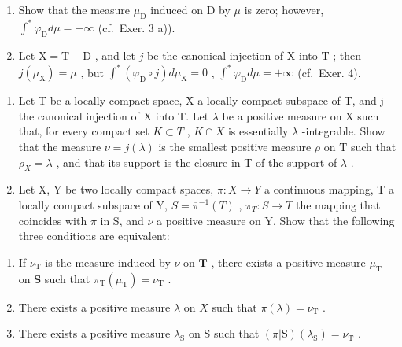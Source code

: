 \begin{enumerate}
\def\labelenumi{\alph{enumi})}
\item
  Show that the measure \(\mu_{\mathrm{D}}\) induced on D by \(\mu\) is zero; however, \(\int^{*}\varphi_{\mathrm{D}}d\mu = +\infty\) (cf.~Exer. 3 a)).
\item
  Let \(\mathrm{X} = \mathrm{T} - \mathrm{D}\) , and let \(j\) be the canonical injection of \(\mathrm{X}\) into \(\mathrm{T}\) ; then \(j(\mu_{\mathrm{X}}) = \mu\) , but \(\int^{*} (\varphi_{\mathrm{D}} \circ j) d\mu_{\mathrm{X}} = 0\) , \(\int^{*} \varphi_{\mathrm{D}} d\mu = +\infty\) (cf.~Exer. 4).
\end{enumerate}

\begin{enumerate}
\def\labelenumi{\arabic{enumi})}
\setcounter{enumi}{5}
\item
  Let T be a locally compact space, X a locally compact subspace of T, and j the canonical injection of X into T. Let \(\lambda\) be a positive measure on X such that, for every compact set \(K \subset T\) , \(K \cap X\) is essentially \(\lambda\) -integrable. Show that the measure \(\nu = j(\lambda)\) is the smallest positive measure \(\rho\) on T such that \(\rho_{X} = \lambda\) , and that its support is the closure in T of the support of \(\lambda\) .
\item
  Let X, Y be two locally compact spaces, \(\pi: X \to Y\) a continuous mapping, T a locally compact subspace of Y, \(S = \overline{\pi}^{-1}(T)\) , \(\pi_{T}: S \to T\) the mapping that coincides with \(\pi\) in S, and \(\nu\) a positive measure on Y. Show that the following three conditions are equivalent:
\end{enumerate}

\begin{enumerate}
\def\labelenumi{\alph{enumi})}
\item
  If \(\nu_{\mathrm{T}}\) is the measure induced by \(\nu\) on \(\mathbf{T}\) , there exists a positive measure \(\mu_{\mathrm{T}}\) on \(\mathbf{S}\) such that \(\pi_{\mathrm{T}}(\mu_{\mathrm{T}}) = \nu_{\mathrm{T}}\) .
\item
  There exists a positive measure \(\lambda\) on \(X\) such that \(\pi (\lambda) = \nu_{\mathrm{T}}\) .
\item
  There exists a positive measure \(\lambda_{\mathrm{S}}\) on S such that \((\pi|\mathrm{S})(\lambda_{\mathrm{S}})=\nu_{\mathrm{T}}\) .
\end{enumerate}

